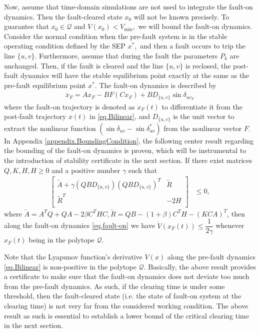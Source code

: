 \documentclass[final]{IEEEtran}
\begin{document}
Now, assume that time-domain simulations are not used to
integrate the fault-on dynamics. Then the fault-cleared state
$x_0$ will not be known precisely. To guarantee that $x_0 \in
\mathcal{Q}$ and $V (x_0) < V_{\min},$ we will bound the fault-on dynamics. Consider the normal condition when the
pre-fault system is in the stable operating condition defined by
the SEP $x^*,$ and then a fault occurs to trip the line $\{u,v\}$.
Furthermore, assume that during the fault the parameters $P_k$
are unchanged. Then, if the fault is cleared and the line $\{u,v\}$ is reclosed,
the post-fault dynamics will have the stable equilibrium point exactly at the
same as the pre-fault equilibrium point $x^*.$ The fault-on dynamics is described by
\begin{align}
\label{eq.fault-on}
\dot{x}_F=Ax_F-BF(Cx_F)+BD_{\{u,v\}}\sin\delta_{{uv}_F}
\end{align}
where the fault-on trajectory is denoted as $x_F(t)$ to
differentiate it from the post-fault trajectory $x(t)$ in
\eqref{eq.Bilinear}, and $D_{\{u,v\}}$ is the unit vector to
extract the nonlinear function
$(\sin\delta_{uv}-\sin\delta^*_{uv})$ from the nonlinear vector
$F$. In Appendix \ref{appendix.BoundingCondition}, the
following center result regarding the bounding of the fault-on dynamics is proven,
which will be instrumental to the introduction of stability certificate
in the next section. If there exist matrices $Q,K,H, H\ge 0$ and a
positive number $\gamma$ such that
\begin{align}
\label{eq.BoundingCondition}
    \left[   \begin{array}{ccccc}
          \tilde{A}+ \gamma (QBD_{\{u,v\}})(QBD_{\{u,v\}})^T  & \tilde{R} \\
          \tilde{R}^T  & -2H\\
        \end{array}\right] &\le 0,
  \end{align}
where $\tilde{A}=A^TQ+QA - 2\beta C^THC,\tilde{R} =
QB-(1+\beta)C^TH-(KCA)^T$, then along the fault-on dynamics
\eqref{eq.fault-on} we have $\dot{V}(x_F(t)) \le
\dfrac{1}{2\gamma}$ whenever $x_F(t)$ being in the polytope
$\mathcal{Q}.$




Note that the Lyapunov function's derivative $\dot{V}(x)$ along
the pre-fault dynamics \eqref{eq.Bilinear} is non-positive in the
polytope $\mathcal{Q}.$ Basically, the above result provides a
certificate to make sure that the fault-on dynamics does not
deviate too much from the pre-fault dynamics. As such, if the
clearing time is under some threshold, then the fault-cleared
state (i.e. the state of fault-on system at the clearing time) is
not very far from the considered working condition. The above
result as such is essential to establish a lower bound of the
critical clearing time in the next section.
\end{document}

